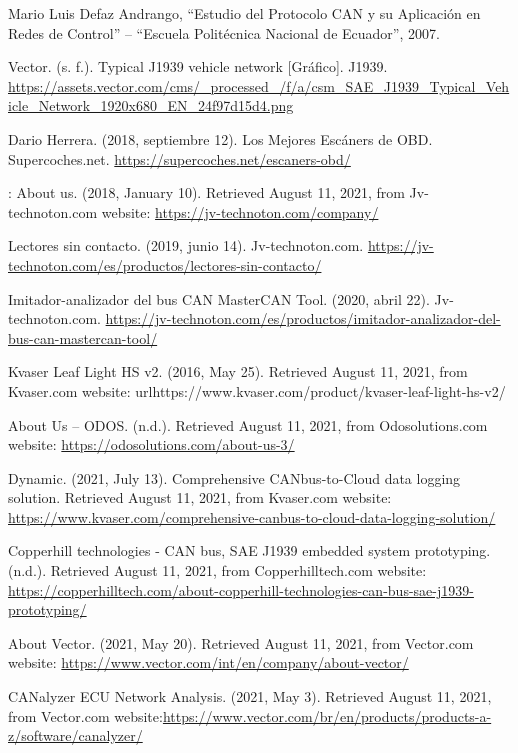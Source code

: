 \begin{thebibliography}{99}
 Mario Luis Defaz Andrango, “Estudio del Protocolo CAN y su Aplicación en Redes de Control” – “Escuela Politécnica Nacional de Ecuador”, 2007.

 Vector. (s. f.). Typical J1939 vehicle network [Gráfico]. J1939. \url{https://assets.vector.com/cms/_processed_/f/a/csm_SAE_J1939_Typical_Vehicle_Network_1920x680_EN_24f97d15d4.png}


 Dario Herrera. (2018, septiembre 12). Los Mejores Escáners de OBD. Supercoches.net. \url{https://supercoches.net/escaners-obd/}

 : About us. (2018, January 10). Retrieved August 11, 2021, from Jv-technoton.com website: \url{https://jv-technoton.com/company/}


Lectores sin contacto. (2019, junio 14). Jv-technoton.com. \url{https://jv-technoton.com/es/productos/lectores-sin-contacto/}

Imitador-analizador del bus CAN MasterCAN Tool. (2020, abril 22). Jv-technoton.com. \url{https://jv-technoton.com/es/productos/imitador-analizador-del-bus-can-mastercan-tool/}

 Kvaser Leaf Light HS v2. (2016, May 25). Retrieved August 11, 2021, from Kvaser.com website: url{https://www.kvaser.com/product/kvaser-leaf-light-hs-v2/}

  About Us – ODOS. (n.d.). Retrieved August 11, 2021, from Odosolutions.com website: \url{https://odosolutions.com/about-us-3/}

 Dynamic. (2021, July 13). Comprehensive CANbus-to-Cloud data logging solution. Retrieved August 11, 2021, from Kvaser.com website: \url{ https://www.kvaser.com/comprehensive-canbus-to-cloud-data-logging-solution/}

Copperhill technologies - CAN bus, SAE J1939 embedded system prototyping. (n.d.). Retrieved August 11, 2021, from Copperhilltech.com website:\url{ https://copperhilltech.com/about-copperhill-technologies-can-bus-sae-j1939-prototyping/}

 About Vector. (2021, May 20). Retrieved August 11, 2021, from Vector.com website: \url{https://www.vector.com/int/en/company/about-vector/}

 CANalyzer ECU Network Analysis. (2021, May 3). Retrieved August 11, 2021, from Vector.com website:\url{https://www.vector.com/br/en/products/products-a-z/software/canalyzer/}


\end{thebibliography}
